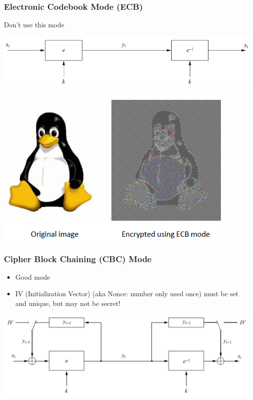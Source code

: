 \subsubsection{Electronic Codebook Mode (ECB)}
Don't use this mode\\
\begin{minipage}{0.6\linewidth}
  \includegraphics[width=0.8\linewidth]{images/EmbeddedSecurity/ecbBlock}
\end{minipage}
\begin{minipage}{0.4\linewidth}
  \includegraphics[width=0.9\linewidth]{images/EmbeddedSecurity/ecbImage}
\end{minipage}

\subsubsection{Cipher Block Chaining (CBC) Mode}
\begin{minipage}{0.3\linewidth}
\begin{itemize}
  \item Good mode
  \item IV (Initialization Vector) (aka Nonce: number only used once) must be set and unique, but may not be secret!
\end{itemize}
\end{minipage}
\begin{minipage}{0.7\linewidth}
  \includegraphics[width=\linewidth]{images/EmbeddedSecurity/cbcBlock}
\end{minipage}


